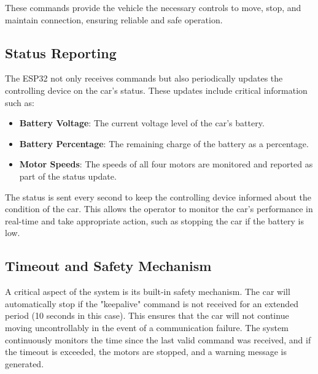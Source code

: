 \documentclass[a4paper,12pt]{article}
\begin{document}
These commands provide the vehicle the necessary controls to move, stop, and maintain connection, ensuring reliable and safe operation.

\subsection{Status Reporting}

The ESP32 not only receives commands but also periodically updates the controlling device on the car's status. These updates include critical information such as:
\begin{itemize}
    \item \textbf{Battery Voltage}: The current voltage level of the car’s battery.
    \item \textbf{Battery Percentage}: The remaining charge of the battery as a percentage.
    \item \textbf{Motor Speeds}: The speeds of all four motors are monitored and reported as part of the status update.
\end{itemize}

The status is sent every second to keep the controlling device informed about the condition of the car. This allows the operator to monitor the car’s performance in real-time and take appropriate action, such as stopping the car if the battery is low.

\subsection{Timeout and Safety Mechanism}

A critical aspect of the system is its built-in safety mechanism. The car will automatically stop if the "keepalive" command is not received for an extended period (10 seconds in this case). This ensures that the car will not continue moving uncontrollably in the event of a communication failure. The system continuously monitors the time since the last valid command was received, and if the timeout is exceeded, the motors are stopped, and a warning message is generated.
\end{document}
